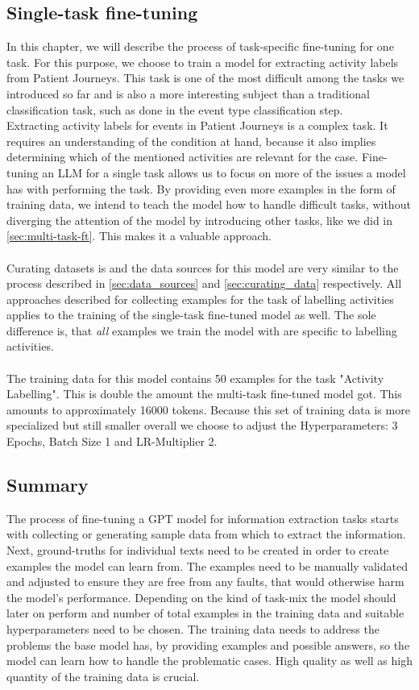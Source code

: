\subsection{Single-task fine-tuning}\label{sec:single-task-ft}
In this chapter, we will describe the process of task-specific fine-tuning for one task. For this purpose, we choose to train a model for extracting activity labels from Patient Journeys. This task is one of the most difficult among the tasks we introduced so far and is also a more interesting subject than a traditional classification task, such as done in the event type classification step.\\
Extracting activity labels for events in Patient Journeys is a complex task. It requires an understanding of the condition at hand, because it also implies determining which of the mentioned activities are relevant for the case. Fine-tuning an LLM for a single task allows us to focus on more of the issues a model has with performing the task. By providing even more examples in the form of training data, we intend to teach the model how to handle difficult tasks, without diverging the attention of the model by introducing other tasks, like we did in \autoref{sec:multi-task-ft}. This makes it a valuable approach.\\\\
Curating datasets is and the data sources for this model are very similar to the process described in \autoref{sec:data_sources} and \autoref{sec:curating_data} respectively. All approaches described for collecting examples for the task of labelling activities applies to the training of the single-task fine-tuned model as well. The sole difference is, that \emph{all} examples we train the model with are specific to labelling activities.\\\\
The training data for this model contains 50 examples for the task "Activity Labelling". This is double the amount the multi-task fine-tuned model got. This amounts to approximately 16000 tokens. Because this set of training data is more specialized but still smaller overall we choose to adjust the Hyperparameters: 3 Epochs, Batch Size 1 and LR-Multiplier 2.

\subsection*{Summary}
The process of fine-tuning a GPT model for information extraction tasks starts with collecting or generating sample data from which to extract the information. Next, ground-truths for individual texts need to be created in order to create examples the model can learn from. The examples need to be manually validated and adjusted to ensure they are free from any faults, that would otherwise harm the model's performance. Depending on the kind of task-mix the model should later on perform and number of total examples in the training data and suitable hyperparameters need to be chosen. The training data needs to address the problems the base model has, by providing examples and possible answers, so the model can learn how to handle the problematic cases. High quality as well as high quantity of the training data is crucial.
